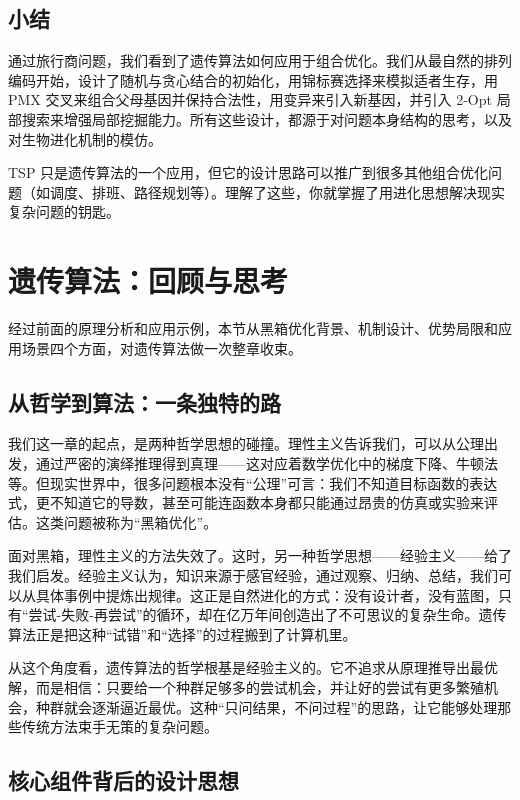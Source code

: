 \documentclass[lang=cn,zihao=-4,a4paper,fontset=windows]{beautybook}
\begin{document}
\subsection{小结}

通过旅行商问题，我们看到了遗传算法如何应用于组合优化。我们从最自然的排列编码开始，设计了随机与贪心结合的初始化，用锦标赛选择来模拟适者生存，用 PMX 交叉来组合父母基因并保持合法性，用变异来引入新基因，并引入 2-Opt 局部搜索来增强局部挖掘能力。所有这些设计，都源于对问题本身结构的思考，以及对生物进化机制的模仿。

TSP 只是遗传算法的一个应用，但它的设计思路可以推广到很多其他组合优化问题（如调度、排班、路径规划等）。理解了这些，你就掌握了用进化思想解决现实复杂问题的钥匙。

\section{遗传算法：回顾与思考}

经过前面的原理分析和应用示例，本节从黑箱优化背景、机制设计、优势局限和应用场景四个方面，对遗传算法做一次整章收束。

\subsection{从哲学到算法：一条独特的路}

我们这一章的起点，是两种哲学思想的碰撞。理性主义告诉我们，可以从公理出发，通过严密的演绎推理得到真理——这对应着数学优化中的梯度下降、牛顿法等。但现实世界中，很多问题根本没有“公理”可言：我们不知道目标函数的表达式，更不知道它的导数，甚至可能连函数本身都只能通过昂贵的仿真或实验来评估。这类问题被称为“黑箱优化”。

面对黑箱，理性主义的方法失效了。这时，另一种哲学思想——经验主义——给了我们启发。经验主义认为，知识来源于感官经验，通过观察、归纳、总结，我们可以从具体事例中提炼出规律。这正是自然进化的方式：没有设计者，没有蓝图，只有“尝试-失败-再尝试”的循环，却在亿万年间创造出了不可思议的复杂生命。遗传算法正是把这种“试错”和“选择”的过程搬到了计算机里。

从这个角度看，遗传算法的哲学根基是经验主义的。它不追求从原理推导出最优解，而是相信：只要给一个种群足够多的尝试机会，并让好的尝试有更多繁殖机会，种群就会逐渐逼近最优。这种“只问结果，不问过程”的思路，让它能够处理那些传统方法束手无策的复杂问题。

\subsection{核心组件背后的设计思想}
\end{document}
